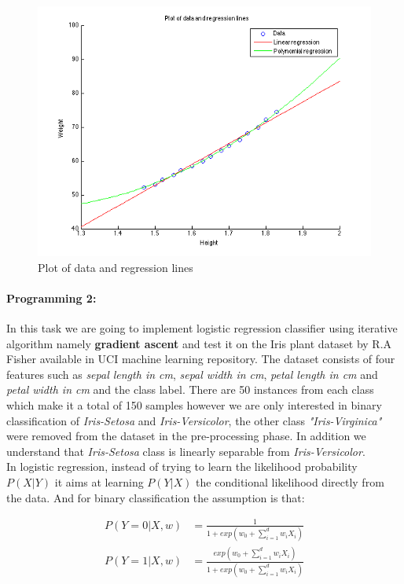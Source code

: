 \documentclass[a4paper]{article}
\begin{document}
	\begin{figure}[H]
		\centering
		\includegraphics[scale=.57]{images/regression.png}
		\caption{Plot of data and regression lines}
		\label{fig:regression}
	\end{figure}
	
\paragraph{Programming 2:} In this task we are going to implement logistic regression classifier using iterative algorithm namely \textbf{gradient ascent} and test it on the Iris plant dataset by R.A Fisher available in UCI machine learning repository. The dataset consists of four features such as \emph{sepal length in cm}, \emph{sepal width in cm}, \emph{petal length in cm} and \emph{petal width in cm} and the class label. There are 50 instances from each class which make it a total of 150 samples however we are only interested in binary classification of \emph{Iris-Setosa} and \emph{Iris-Versicolor}, the other class \emph{"Iris-Virginica"} were removed from the dataset in the pre-processing phase. In addition we understand that \emph{Iris-Setosa} class is linearly separable from \emph{Iris-Versicolor}. \\ 

	In logistic regression, instead of trying to learn the likelihood probability $P(X|Y)$ it aims at learning $P(Y|X)$ the conditional likelihood directly from the data. And for binary classification the assumption is that:
	
	\begin{align}
		P(Y=0|X,w) &= \frac{1}{1+exp(w_0 + \sum_{i=1}^{d} w_iX_i)} \\ 
		P(Y=1|X,w) &= \frac{exp(w_0 + \sum_{i=1}^{d} w_iX_i)}{1+exp(w_0 + \sum_{i=1}^{d} w_iX_i)}
	\end{align}
	
\end{document}
